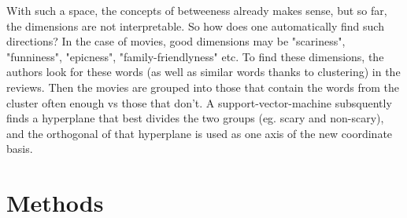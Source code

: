 \documentclass[11pt,
  paper=a4, 
  bibliography=totocnumbered,
	captions=tableheading,
	BCOR=10mm
]{scrreprt}
\theoremstyle{definition}
\newcommand{\eg}{e.\,g.~}
\newcommand{\figref}[1]{(Figure \ref{#1})}
\newcommand{\tabref}[1]{(Table \ref{#1})}
\newcommand\slcaption[1]{\setsepchar{.}\readlist*\pdots{#1}\caption[{\pdots[1].}]{#1}}
\begin{document}
With such a space, the concepts of betweeness already makes sense, but so far, the dimensions are not interpretable. So how does one automatically find such directions? In the case of movies, good dimensions may be "scariness", "funniness", "epicness", "family-friendlyness" etc. 
To find these dimensions, the authors look for these words (as well as similar words thanks to clustering) in the reviews. Then the movies are grouped into those that contain the words from the cluster often enough vs those that don't. A support-vector-machine subsquently finds a hyperplane that best divides the two groups (eg. scary and non-scary), and the orthogonal of that hyperplane is used as one axis of the new coordinate basis. 





\chapter{Methods}
\end{document}
